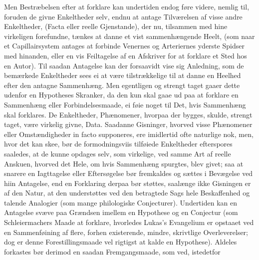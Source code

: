 \documentclass[12pt]{book}
\def\textit#1{#1}%
\def\emph#1{#1}%
\newcommand{\opage}[1]{\marginnote{\footnotesize\textit{[#1]}}}
\begin{document}
Men Bestræbelsen efter at forklare kan undertiden endog føre videre, nemlig
til, foruden de givne Enkeltheder selv, endnu at antage Tilværelsen af visse
andre \emph{Enkeltheder, (Facta eller reelle Gjenstande)}, der nu, tilsammen
med hine virkeligen forefundne, tænkes at danne et vist sammenhængende Heelt,
(som naar et Capillairsystem antages at forbinde Venernes og Arteriernes
yderste Spidser med hinanden, eller en vis Feiltagelse af en Afskriver for at
forklare et Sted hos en Autor). Til saadan Antagelse kan der forsaavidt vise
sig Anledning, som de bemærkede Enkeltheder sees ei at være tilstrækkelige til
at
\opage{67} danne en Heelhed efter den antagne Sammenhæng. Men egentligen og strengt taget
gaaer dette udenfor en Hypotheses Skranker, da den kun skal gaae ud paa at
forklare en Sammenhæng eller Forbindelsesmaade, ei føie noget til Det, hvis
Sammenhæng skal forklares. De Enkeltheder, Phænomener, hvorpaa der bygges,
skulde, strengt taget, være virkelig givne, Data. Saadanne Gisninger, hvorved
visse Phænomener eller Omstændigheder \textit{in facto} supponeres, ere
imidlertid ofte naturlige nok, men, hvor det kan skee, bør de formodningsviis
tilføiede Enkeltheder efterspores saaledes, at de kunne opdages selv, som
virkelige, ved samme Art af reelle Anskuen, hvorved det Hele, om hvis
Sammenhæng spurgtes, blev givet; saa at snarere en Iagttagelse eller
Eftersøgelse bør fremkaldes og sættes i Bevægelse ved hiin Antagelse, end en
Forklaring derpaa bør støttes, saalænge ikke Gisningen er af den Natur, at den
understøttes ved den betragtede Sags hele Beskaffenhed og talende Analogier
(som mange philologiske Conjecturer). Undertiden kan en Antagelse svæve paa
Grændsen imellem en Hypothese og en Conjectur (som Schleiermachers Maade at
forklare, hvorledes Lukas's Evangelium er opstaaet ved en Sammenføining af
flere, forhen existerende, mindre, skrivtlige Overleverelser; dog er denne
Forestillingsmaade vel rigtigst at kalde en Hypothese). Aldeles forkastes bør
derimod en saadan Fremgangsmaade, som ved, istedetfor
\end{document}
